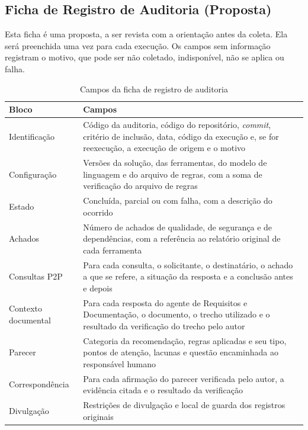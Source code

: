 \begin{apendicesenv}

\partapendices

\chapter{Ficha de Registro de Auditoria (Proposta)}
\label{ap-ficha}

Esta ficha é uma proposta, a ser revista com a orientação antes da coleta. Ela será preenchida uma vez para cada execução. Os campos sem informação registram o motivo, que pode ser não coletado, indisponível, não se aplica ou falha.

\begin{table}[htbp]
\centering
\caption{Campos da ficha de registro de auditoria}
\label{tab-ficha}
\begingroup
\footnotesize
\SingleSpacing
\renewcommand{\arraystretch}{1.15}
\begin{tabularx}{\textwidth}{>{\raggedright\arraybackslash}p{3.4cm}>{\raggedright\arraybackslash}X}
\hline
\textbf{Bloco} & \textbf{Campos} \\ \hline
Identificação & Código da auditoria, código do repositório, \textit{commit}, critério de inclusão, data, código da execução e, se for reexecução, a execução de origem e o motivo \\ \hline
Configuração & Versões da solução, das ferramentas, do modelo de linguagem e do arquivo de regras, com a soma de verificação do arquivo de regras \\ \hline
Estado & Concluída, parcial ou com falha, com a descrição do ocorrido \\ \hline
Achados & Número de achados de qualidade, de segurança e de dependências, com a referência ao relatório original de cada ferramenta \\ \hline
Consultas P2P & Para cada consulta, o solicitante, o destinatário, o achado a que se refere, a situação da resposta e a conclusão antes e depois \\ \hline
Contexto documental & Para cada resposta do agente de Requisitos e Documentação, o documento, o trecho utilizado e o resultado da verificação do trecho pelo autor \\ \hline
Parecer & Categoria da recomendação, regras aplicadas e seu tipo, pontos de atenção, lacunas e questão encaminhada ao responsável humano \\ \hline
Correspondência & Para cada afirmação do parecer verificada pelo autor, a evidência citada e o resultado da verificação \\ \hline
Divulgação & Restrições de divulgação e local de guarda dos registros originais \\ \hline
\end{tabularx}
\endgroup
{}
\end{table}


\end{apendicesenv}
